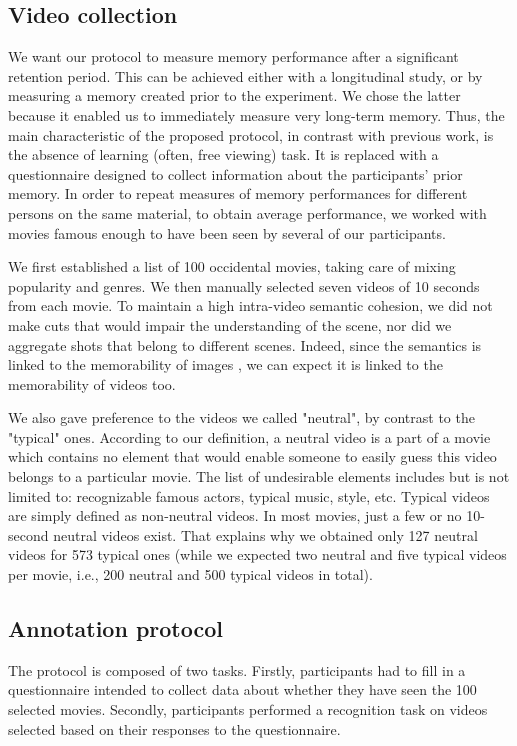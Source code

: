 \documentclass[sigconf]{acmart}
\begin{document}
\subsection{Video collection}
We want our protocol to measure memory performance after a significant retention period.
This can be achieved either with a longitudinal study, or by measuring a memory created prior to the experiment.
We chose the latter because it enabled us to immediately measure very long-term memory.
Thus, the main characteristic of the proposed protocol, in contrast with previous work, is the absence of learning (often, free viewing) task.
It is replaced with a questionnaire designed to collect information about the participants' prior memory.
In order to repeat measures of memory performances for different persons on the same material, to obtain average performance, we worked with movies famous enough to have been seen by several of our participants.

We first established a list of 100 occidental movies, taking care of mixing popularity and genres.
We then manually selected seven videos of 10 seconds from each movie.
To maintain a high intra-video semantic cohesion, we did not make cuts that would impair the understanding of the scene, nor did we aggregate shots that belong to different scenes.
Indeed, since the semantics is linked to the memorability of images \cite{isola_2014_makes}, we can expect it is linked to the memorability of videos too.

We also gave preference to the videos we called "neutral", by contrast to the "typical" ones.
According to our definition, a neutral video is a part of a movie which contains no element that would enable someone to easily guess this video belongs to a particular movie.
The list of undesirable elements includes but is not limited to: recognizable famous actors, typical music, style, etc.
Typical videos are simply defined as non-neutral videos.
In most movies, just a few or no 10-second neutral videos exist.
That explains why we obtained only 127 neutral videos for 573 typical ones (while we expected two neutral and five typical videos per movie, i.e., 200 neutral and 500 typical videos in total).
 
\subsection{Annotation protocol}
The protocol is composed of two tasks.
Firstly, participants had to fill in a questionnaire intended to collect data about whether they have seen the 100 selected movies.
Secondly, participants performed a recognition task on videos selected based on their responses to the questionnaire.
\end{document}
